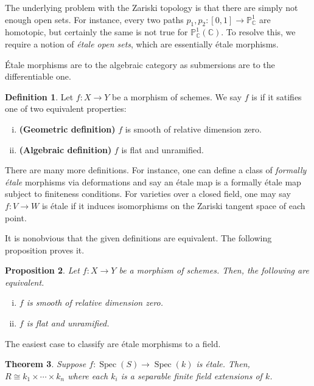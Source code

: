 \documentclass{amsart}
\DeclareMathOperator{\Spec}{Spec}
\newtheorem{theorem}{Theorem}[section]
\newtheorem{proposition}[theorem]{Proposition}
\theoremstyle{definition}
\newtheorem{definition}[theorem]{Definition}
\theoremstyle{remark}
\begin{document}
The underlying problem with the Zariski topology is that there are simply not
enough open sets. For instance, every two paths $p_1, p_2 : [0, 1] \to
\mathbb{P}^1_{\mathbb{C}}$ are homotopic, but certainly the same is not true for
$\mathbb{P}_\mathbb{C}^1(\mathbb{C})$. To resolve this, we require a notion of
\textit{\'etale open sets}, which are essentially \'etale morphisms.

\'Etale morphisms are to the algebraic category as submersions are to the
differentiable one.

\begin{definition}
    Let $f : X \to Y$ be a morphism of schemes. We say $f$ is  if
    it satifies one of two equivalent properties:
    \begin{enumerate}[(i)]
        \item \textbf{(Geometric definition)} $f$ is smooth of relative
            dimension zero.

        \item \textbf{(Algebraic definition)} $f$ is flat and unramified.
    \end{enumerate}
\end{definition}

There are many more definitions. For instance, one can define a class of
\textit{formally \'etale} morphisms via deformations and say an \'etale map is a
formally \'etale map subject to finiteness conditions. For varieties over a
closed field, one may say $f : V \to W$ is \'etale if it induces isomorphisms on
the Zariski tangent space of each point.

It is nonobvious that the given definitions are equivalent. The following
proposition proves it.

\begin{proposition}
    Let $f : X \to Y$ be a morphism of schemes. Then, the following are
    equivalent.
    \begin{enumerate}[(i)]
        \item $f$ is smooth of relative dimension zero.
        \item $f$ is flat and unramified.
    \end{enumerate}
\end{proposition}

The easiest case to classify are \'etale morphisms to a field.

\begin{theorem}
    Suppose $f : \Spec(S) \to \Spec(k)$ is \'etale. Then, $R \cong k_1 \times
    \cdots \times k_n$ where each $k_i$ is a separable finite field extensions
    of $k$.
\end{theorem}
\end{document}
